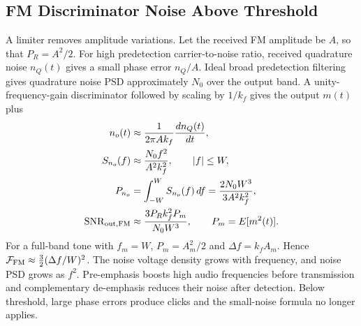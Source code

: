 \documentclass[12pt,a4paper]{article}
\begin{document}
\subsection{FM Discriminator Noise Above Threshold}
A limiter removes amplitude variations. Let the received FM amplitude be $A$, so that $P_R=A^2/2$. For high predetection carrier-to-noise ratio, received quadrature noise $n_Q(t)$ gives a small phase error $n_Q/A$. Ideal broad predetection filtering gives quadrature noise PSD approximately $N_0$ over the output band. A unity-frequency-gain discriminator followed by scaling by $1/k_f$ gives the output $m(t)$ plus
\[
\begin{aligned}
 n_o(t)&\approx \frac{1}{2\pi A k_f}\frac{d n_Q(t)}{dt},\\
 S_{n_o}(f)&\approx \frac{N_0 f^2}{A^2 k_f^2},\qquad |f|\le W,\\
 P_{n_o}&=\int_{-W}^{W}S_{n_o}(f)\,df
          =\frac{2N_0 W^3}{3A^2k_f^2},\\
 \mathrm{SNR}_{\rm out,FM}
      &\approx\frac{3P_Rk_f^2P_m}{N_0W^3},
      \qquad P_m=E[m^2(t)].
\end{aligned}
\]
For a full-band tone with $f_m=W$, $P_m=A_m^2/2$ and $\Delta f=k_f A_m$. Hence $\mathcal F_{\rm FM}\approx\tfrac32(\Delta f/W)^2$. The noise voltage density grows with frequency, and noise PSD grows as $f^2$. Pre-emphasis boosts high audio frequencies before transmission and complementary de-emphasis reduces their noise after detection. Below threshold, large phase errors produce clicks and the small-noise formula no longer applies.

\begin{tcolorbox}[tikzbox, unbreakable, title={FM Discriminator Output Noise PSD}]
\centering
{}\par
\end{tcolorbox}
\end{document}
